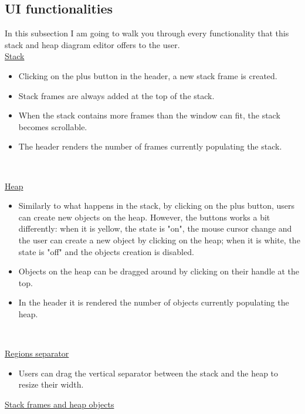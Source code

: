 \documentclass[]{usiinfbachelorproject}
\begin{document}
\subsection{UI functionalities}

In this subsection I am going to walk you through every functionality that this stack and heap diagram editor offers to the user.\\

\ul{Stack}

\begin{itemize}
	\item Clicking on the plus button in the header, a new stack frame is created.
	\item Stack frames are always added at the top of the stack.
	\item When the stack contains more frames than the window can fit, the stack becomes scrollable. 
	\item The header renders the number of frames currently populating the stack.
\end{itemize}\

\ul{Heap}

\begin{itemize}
	\item Similarly to what happens in the stack, by clicking on the plus button, users can create new objects on the heap. However, the buttons works a bit differently: when it is yellow, the state is "on", the mouse cursor change and the user can create a new object by clicking on the heap; when it is white, the state is "off" and the objects creation is disabled.
	\item Objects on the heap can be dragged around by clicking on their handle at the top.
	\item In the header it is rendered the number of objects currently populating the heap.
\end{itemize}\

\ul{Regions separator}

\begin{itemize}
	\item Users can drag the vertical separator between the stack and the heap to resize their width.
\end{itemize}

\ul{Stack frames and heap objects}
\end{document}
